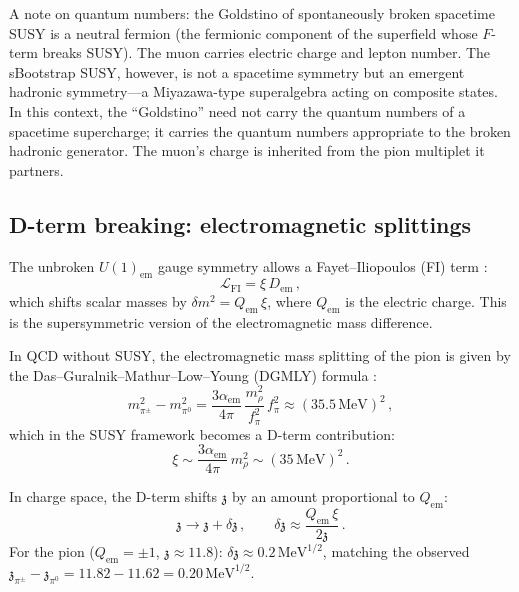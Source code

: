 \documentclass[12pt,a4paper]{article}
\newcommand{\MeV}{\,\text{MeV}}
\newcommand{\zch}{\mathfrak{z}}
\begin{document}
A note on quantum numbers: the Goldstino of spontaneously broken 
spacetime SUSY is a neutral fermion (the fermionic component of the 
superfield whose $F$-term breaks SUSY). The muon carries electric 
charge and lepton number. The sBootstrap SUSY, however, is not a 
spacetime symmetry but an emergent hadronic symmetry---a 
Miyazawa-type superalgebra \cite{Miyazawa} acting on composite 
states. In this context, the ``Goldstino'' need not carry the 
quantum numbers of a spacetime supercharge; it carries the quantum 
numbers appropriate to the broken hadronic generator. The muon's 
charge is inherited from the pion multiplet it partners.

\subsection{D-term breaking: electromagnetic splittings}
\label{subsec:dterm}

The unbroken $U(1)_{\text{em}}$ gauge symmetry allows a 
Fayet--Iliopoulos (FI) term \cite{FayetIliopoulos}:
\begin{equation}
\mathcal{L}_{\text{FI}} = \xi\,D_{\text{em}}\,,
\end{equation}
which shifts scalar masses by $\delta m^2 = Q_{\text{em}}\,\xi$, 
where $Q_{\text{em}}$ is the electric charge. This is the 
supersymmetric version of the electromagnetic mass difference.

In QCD without SUSY, the electromagnetic mass splitting of the 
pion is given by the Das--Guralnik--Mathur--Low--Young (DGMLY) 
formula \cite{DGMLY1967}:
\begin{equation}
m_{\pi^\pm}^2 - m_{\pi^0}^2 = \frac{3\alpha_{\text{em}}}{4\pi}\,
\frac{m_\rho^2}{f_\pi^2}\,f_\pi^2 
\approx (35.5\MeV)^2\,,
\end{equation}
which in the SUSY framework becomes a D-term contribution:
\begin{equation}
\xi \sim \frac{3\alpha_{\text{em}}}{4\pi}\,m_\rho^2 
\sim (35\MeV)^2\,.
\end{equation}

In charge space, the D-term shifts $\zch$ by an amount proportional 
to $Q_{\text{em}}$:
\begin{equation}
\zch \to \zch + \delta\zch\,, \qquad 
\delta\zch \approx \frac{Q_{\text{em}}\,\xi}{2\zch}\,.
\end{equation}
For the pion ($Q_{\text{em}} = \pm 1$, $\zch \approx 11.8$): 
$\delta\zch \approx 0.2\MeV^{1/2}$, matching the observed 
$\zch_{\pi^\pm} - \zch_{\pi^0} = 11.82 - 11.62 = 0.20\MeV^{1/2}$.
\end{document}
